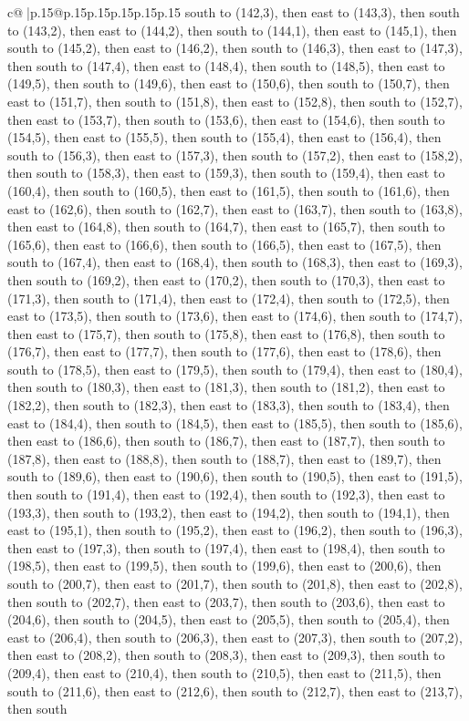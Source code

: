 \documentclass{article}
\begin{document}
{\begin{supertabular}{c@{$\;$}|p{.15\linewidth}@{}p{.15\linewidth}p{.15\linewidth}p{.15\linewidth}p{.15\linewidth}p{.15\linewidth}}
{{{south to (142,3), then east to (143,3), then south to (143,2), then east to (144,2), then south to (144,1), then east to (145,1), then south to (145,2), then east to (146,2), then south to (146,3), then east to (147,3), then south to (147,4), then east to (148,4), then south to (148,5), then east to (149,5), then south to (149,6), then east to (150,6), then south to (150,7), then east to (151,7), then south to (151,8), then east to (152,8), then south to (152,7), then east to (153,7), then south to (153,6), then east to (154,6), then south to (154,5), then east to (155,5), then south to (155,4), then east to (156,4), then south to (156,3), then east to (157,3), then south to (157,2), then east to (158,2), then south to (158,3), then east to (159,3), then south to (159,4), then east to (160,4), then south to (160,5), then east to (161,5), then south to (161,6), then east to (162,6), then south to (162,7), then east to (163,7), then south to (163,8), then east to (164,8), then south to (164,7), then east to (165,7), then south to (165,6), then east to (166,6), then south to (166,5), then east to (167,5), then south to (167,4), then east to (168,4), then south to (168,3), then east to (169,3), then south to (169,2), then east to (170,2), then south to (170,3), then east to (171,3), then south to (171,4), then east to (172,4), then south to (172,5), then east to (173,5), then south to (173,6), then east to (174,6), then south to (174,7), then east to (175,7), then south to (175,8), then east to (176,8), then south to (176,7), then east to (177,7), then south to (177,6), then east to (178,6), then south to (178,5), then east to (179,5), then south to (179,4), then east to (180,4), then south to (180,3), then east to (181,3), then south to (181,2), then east to (182,2), then south to (182,3), then east to (183,3), then south to (183,4), then east to (184,4), then south to (184,5), then east to (185,5), then south to (185,6), then east to (186,6), then south to (186,7), then east to (187,7), then south to (187,8), then east to (188,8), then south to (188,7), then east to (189,7), then south to (189,6), then east to (190,6), then south to (190,5), then east to (191,5), then south to (191,4), then east to (192,4), then south to (192,3), then east to (193,3), then south to (193,2), then east to (194,2), then south to (194,1), then east to (195,1), then south to (195,2), then east to (196,2), then south to (196,3), then east to (197,3), then south to (197,4), then east to (198,4), then south to (198,5), then east to (199,5), then south to (199,6), then east to (200,6), then south to (200,7), then east to (201,7), then south to (201,8), then east to (202,8), then south to (202,7), then east to (203,7), then south to (203,6), then east to (204,6), then south to (204,5), then east to (205,5), then south to (205,4), then east to (206,4), then south to (206,3), then east to (207,3), then south to (207,2), then east to (208,2), then south to (208,3), then east to (209,3), then south to (209,4), then east to (210,4), then south to (210,5), then east to (211,5), then south to (211,6), then east to (212,6), then south to (212,7), then east to (213,7), then south }}}
\end{supertabular}}
\end{document}
